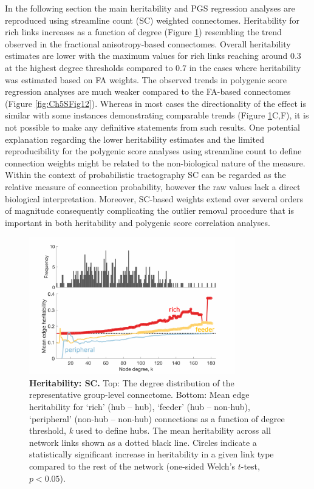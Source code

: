 \clearpage
In the following section the main heritability and PGS regression analyses are reproduced using streamline count (SC) weighted connectomes. Heritability for rich links increases as a function of degree (Figure \ref{fig:Ch5SFig11}) resembling the trend observed in the fractional anisotropy-based connectomes. Overall heritability estimates are lower with the maximum values for rich links reaching around $0.3$ at the highest degree thresholds compared to $0.7$ in the cases where heritability was estimated based on FA weights. The observed trends in polygenic score regression analyses are much weaker compared to the FA-based connectomes (Figure \ref{fig:Ch5SFig12}). Whereas in most cases the directionality of the effect is similar with some instances demonstrating comparable trends (Figure \ref{fig:Ch5SFig11}C,F), it is not possible to make any definitive statements from such results. One potential explanation regarding the lower heritability estimates and the limited reproducibility for the polygenic score analyses using streamline count to define connection weights might be related to the non-biological nature of the measure. Within the context of probabilistic tractography SC can be regarded as the relative measure of connection probability, however the raw values lack a direct biological interpretation. Moreover, SC-based weights extend over several orders of magnitude consequently complicating the outlier removal procedure that is important in both heritability and polygenic score correlation analyses.

\begin{figure}[h!]
\begin{center}
\includegraphics[width=0.8\textwidth]{Chapter5/SFigure11.pdf}%
\end{center}
\caption{\textbf{Heritability: SC.}
Top: The degree distribution of the representative group-level connectome. Bottom: Mean edge heritability for `rich' (hub -- hub), `feeder' (hub -- non-hub), `peripheral' (non-hub -- non-hub) connections as a function of degree threshold, \textit{k} used to define hubs. The mean heritability across all network links shown as a dotted black line. Circles indicate a statistically significant increase in heritability in a given link type compared to the rest of the network (one-sided Welch's $t$-test, $p < 0.05$). }
\label{fig:Ch5SFig11}
\end{figure}

